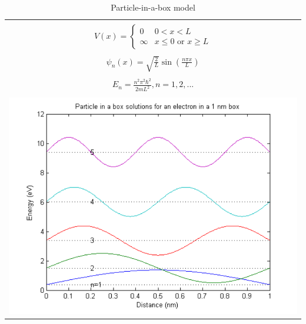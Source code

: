 \documentclass[11pt]{article}
\begin{document}
\begin{outline}
\begin{outline}
  \end{outline}
\begin{table}[tb]
   \begin{center}
   \caption{Particle-in-a-box model}
    \label{Particle-in-a-box}
\begin{tabular}[h]{|c|}
\hline
 \\
$\displaystyle       V(x) = \left \{
        \begin{array}{rl}
          0 & 0 < x < L \\
          \infty & x \leq 0 \text{ or } x \geq L
        \end{array} \right . $ \\
 \\
$\displaystyle     \psi_n(x) =\sqrt{\frac{2}{L}} \sin \left ( \frac{n\pi x}{L} \right )$
\\ 
 \\
$\displaystyle     E_n =\frac{n^2\pi^2\hbar^2}{2mL^2}, n = 1, 2, ...$ \\
 \\
     \includegraphics[scale=.6]{Images/PIB} \\       
\hline
\end{tabular}
 \end{center}
\end{table}



\end{outline}
\end{document}
